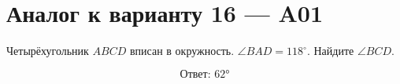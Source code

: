 


\section*{Аналог к варианту 16 — A01}
Четырёхугольник \(ABCD\) вписан в окружность. \(\angle BAD=118^\circ\). Найдите \(\angle BCD\).
\begin{center}\figCyclicOpposite\end{center}
\[\boxed{\text{Ответ: }62°}\]

